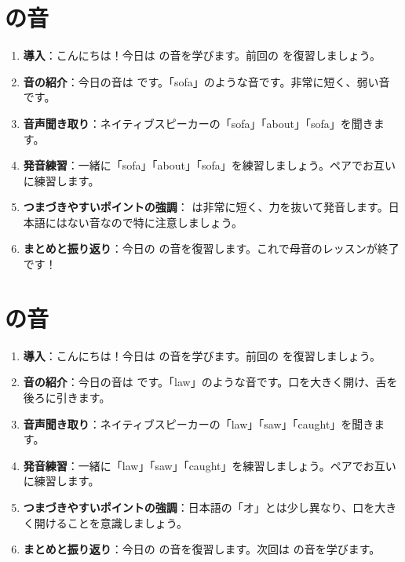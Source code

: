 \documentclass[book,jafontscale=0.9247]{jlreq}
\begin{document}
\section{\textipa{/\textschwa /} の音}
\begin{enumerate}
    \item \textbf{導入}：こんにちは！今日は \textipa{/\textschwa /} の音を学びます。前回の  を復習しましょう。
    \item \textbf{音の紹介}：今日の音は \textipa{/\textschwa /} です。「sofa」のような音です。非常に短く、弱い音です。
    \item \textbf{音声聞き取り}：ネイティブスピーカーの「sofa」「about」「sofa」を聞きます。
    \item \textbf{発音練習}：一緒に「sofa」「about」「sofa」を練習しましょう。ペアでお互いに練習します。
    \item \textbf{つまづきやすいポイントの強調}： \textipa{/\textschwa /} は非常に短く、力を抜いて発音します。日本語にはない音なので特に注意しましょう。
    \item \textbf{まとめと振り返り}：今日の \textipa{/\textschwa /} の音を復習します。これで母音のレッスンが終了です！
\end{enumerate}

\section{\textipa{/\textopeno :/} の音}
\begin{enumerate}
    \item \textbf{導入}：こんにちは！今日は \textipa{/\textopeno :/} の音を学びます。前回の  を復習しましょう。
    \item \textbf{音の紹介}：今日の音は \textipa{/\textopeno:/} です。「law」のような音です。口を大きく開け、舌を後ろに引きます。
    \item \textbf{音声聞き取り}：ネイティブスピーカーの「law」「saw」「caught」を聞きます。
    \item \textbf{発音練習}：一緒に「law」「saw」「caught」を練習しましょう。ペアでお互いに練習します。
    \item \textbf{つまづきやすいポイントの強調}：日本語の「オ」とは少し異なり、口を大きく開けることを意識しましょう。
    \item \textbf{まとめと振り返り}：今日の  の音を復習します。次回は  の音を学びます。
\end{enumerate}
\end{document}

